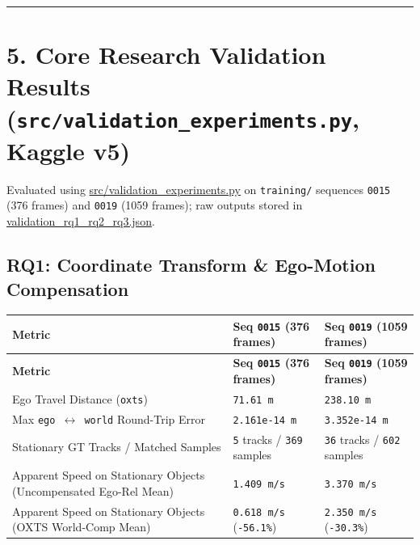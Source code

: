 \documentclass[10.5pt,a4paper]{article}
\begin{document}
\par\noindent\rule{\textwidth}{0.4pt}\par\medskip

\section{5. Core Research Validation Results (\texttt{src/\allowbreak{}validation\_\allowbreak{}experiments.\allowbreak{}py}, Kaggle v5)}

Evaluated using \href{https://github.com/Heisnotanimposter/Totalcare\_autonomous\_driving\_Yolov5/blob/main/src/validation\_experiments.py}{src/validation\_experiments.py} on \texttt{training/\allowbreak{}} sequences \texttt{0015} (376 frames) and \texttt{0019} (1059 frames); raw outputs stored in \href{https://github.com/Heisnotanimposter/Totalcare\_autonomous\_driving\_Yolov5/blob/main/results/world\_model/world\_outputs/validation\_rq1\_rq2\_rq3.json}{validation\_rq1\_rq2\_rq3.json}.


\subsection{RQ1: Coordinate Transform \& Ego-Motion Compensation}

\begin{footnotesize}
\setlength{\tabcolsep}{4pt}
\setlength{\LTleft}{0pt}\setlength{\LTright}{0pt}
\begin{longtable}{>{\raggedright\arraybackslash}p{} >{\raggedright\arraybackslash}p{} >{\raggedright\arraybackslash}p{}}
\toprule
\textbf{Metric} & \textbf{Seq \texttt{0015} (376 frames)} & \textbf{Seq \texttt{0019} (1059 frames)} \\
\midrule
\endfirsthead
\toprule
\textbf{Metric} & \textbf{Seq \texttt{0015} (376 frames)} & \textbf{Seq \texttt{0019} (1059 frames)} \\
\midrule
\endhead
\bottomrule
\endfoot
Ego Travel Distance (\texttt{oxts}) & \texttt{71.\allowbreak{}61 m} & \texttt{238.\allowbreak{}10 m} \\
Max \texttt{ego $\leftrightarrow$ world} Round-Trip Error & \texttt{2.\allowbreak{}161e-\allowbreak{}14 m} & \texttt{3.\allowbreak{}352e-\allowbreak{}14 m} \\
Stationary GT Tracks / Matched Samples & \texttt{5} tracks / \texttt{369} samples & \texttt{36} tracks / \texttt{602} samples \\
Apparent Speed on Stationary Objects (Uncompensated Ego-Rel Mean) & \texttt{1.\allowbreak{}409 m/\allowbreak{}s} & \texttt{3.\allowbreak{}370 m/\allowbreak{}s} \\
Apparent Speed on Stationary Objects (OXTS World-Comp Mean) & \texttt{0.\allowbreak{}618 m/\allowbreak{}s} (\texttt{-\allowbreak{}56.\allowbreak{}1\%}) & \texttt{2.\allowbreak{}350 m/\allowbreak{}s} (\texttt{-\allowbreak{}30.\allowbreak{}3\%}) \\
\end{longtable}
\end{footnotesize}
\end{document}

